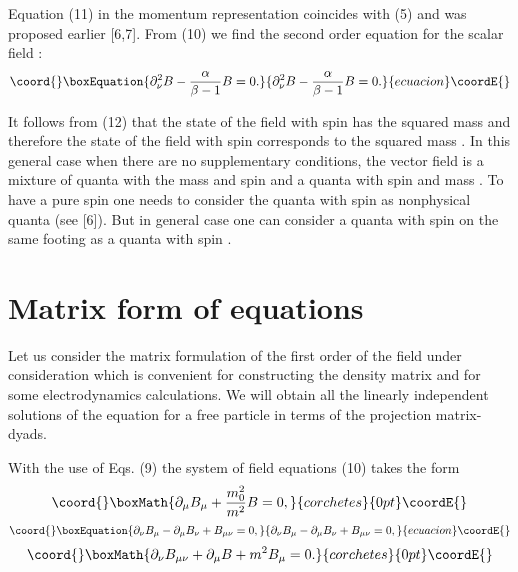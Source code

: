 \documentclass[a4paper,12pt]{article}
\begin{document}
Equation (11) in the momentum representation coincides with (5)
and was proposed earlier [6,7]. From (10) we find the second order
equation for the scalar field \coordHE{}:
\begin{equation}\coord{}\boxEquation{
\partial _\nu ^2B-\frac{\alpha }{\beta -1}B=0.  \label{12}
}{
\partial _\nu ^2B-\frac{\alpha }{\beta -1}B=0.  }{ecuacion}\coordE{}\end{equation}

It follows from (12) that the state of the field with spin \coordHE{}
has the squared mass \coordHE{} and
therefore the state of the field with spin \coordHE{} corresponds to
the squared mass \coordHE{}. In this general case when there
are no supplementary conditions, the vector field is a mixture of
quanta with the mass \coordHE{} and spin \coordHE{} and a quanta with spin \coordHE{}
and mass \coordHE{}. To have a pure spin \coordHE{} one needs to consider the
quanta with spin \coordHE{} as nonphysical quanta (see [6]). But in
general case one can consider a quanta with spin \coordHE{} on the same
footing as a quanta with spin \coordHE{}.

\section{Matrix form of equations}

Let us consider the matrix formulation of the first order of the
field under consideration which is convenient for constructing the
density matrix and for some electrodynamics calculations. We will
obtain all the linearly independent solutions of the equation for
a free particle in terms of the projection matrix-dyads.

With the use of Eqs. (9) the system of field equations (10) takes
the form
\[\coord{}\boxMath{
\partial _\mu B_\mu +\frac{m_0^2}{m^2}B=0,
}{corchetes}{0pt}\coordE{}\]
\begin{equation}\coord{}\boxEquation{
\partial _\nu B_\mu-\partial _\mu B_\nu+B_{\mu \nu }=0, \label{13}
}{
\partial _\nu B_\mu-\partial _\mu B_\nu+B_{\mu \nu }=0, }{ecuacion}\coordE{}\end{equation}
\[\coord{}\boxMath{
\partial _\nu B_{\mu \nu }+\partial _\mu B+m^2 B_\mu =0.
}{corchetes}{0pt}\coordE{}\]
\end{document}
